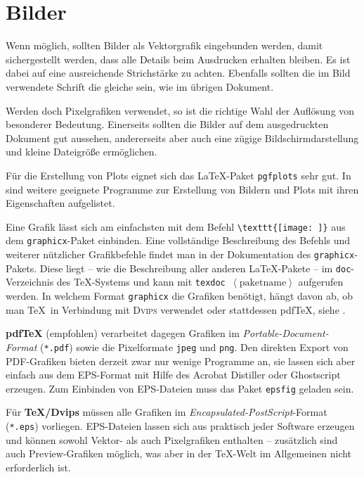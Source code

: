 \section{Bilder}
\label{sec:Latex-Bilder}

Wenn möglich, sollten Bilder als Vektorgrafik eingebunden werden, damit sichergestellt werden, dass alle Details beim Ausdrucken erhalten bleiben.
Es ist dabei auf eine ausreichende Strichstärke zu achten.
Ebenfalls sollten die im Bild verwendete Schrift die gleiche sein, wie im übrigen Dokument.

Werden doch Pixelgrafiken verwendet, so ist die richtige Wahl der Auflösung von besonderer Bedeutung.
Einerseits sollten die Bilder auf dem ausgedruckten Dokument gut aussehen, andererseits aber auch eine zügige Bildschirmdarstellung und kleine Dateigröße ermöglichen.


Für die Erstellung von Plots eignet sich das \LaTeX-Paket \texttt{pgfplots} sehr gut.
In  sind weitere geeignete Programme zur Erstellung von Bildern und Plots mit ihren Eigenschaften aufgelistet.

Eine Grafik lässt sich am einfachsten mit dem Befehl \verb|\texttt{[image: ]}| aus dem \verb|graphicx|-Paket einbinden.
Eine vollständige Beschreibung des Befehls und weiterer nützlicher Grafikbefehle findet man in der Dokumentation des \verb|graphicx|-Pakets.
Diese liegt -- wie die Beschreibung aller anderen \LaTeX-Pakete -- im \verb|doc|-Verzeichnis des \TeX-Systems und kann mit \texttt{texdoc $\left\langle\text{paketname}\right\rangle$} aufgerufen werden.
In welchem Format \verb|graphicx| die Grafiken benötigt, hängt davon ab, ob man \TeX\ in Verbindung mit \textsc{Dvips} verwendet oder stattdessen pdf\TeX, siehe .

\textbf{pdf\TeX} (empfohlen) verarbeitet dagegen Grafiken im \emph{Portable-Document-Format} (\verb|*.pdf|) sowie die Pixelformate \texttt{jpeg} und \texttt{png}.
Den direkten Export von PDF-Grafiken bieten derzeit zwar nur wenige Programme an, sie lassen sich aber einfach aus dem EPS-Format mit Hilfe des Acrobat Distiller oder Ghostscript erzeugen.
Zum Einbinden von EPS-Dateien muss das Paket \texttt{epsfig} geladen sein.

Für \textbf{\TeX/Dvips} müssen alle Grafiken im \emph{Encapsulated-PostScript}-Format (\verb|*.eps|) vorliegen.
EPS-Dateien lassen sich aus praktisch jeder Software erzeugen und können sowohl Vektor- als auch Pixelgrafiken enthalten -- zusätzlich sind auch Preview-Grafiken möglich, was aber in der \TeX-Welt im Allgemeinen nicht erforderlich ist.

